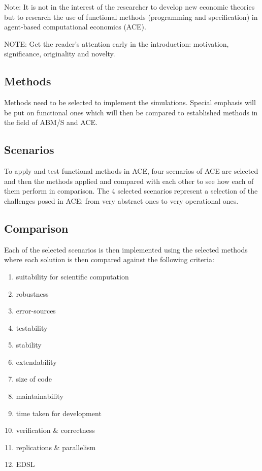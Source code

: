 \documentclass{article}
\begin{document}
Note: It is not in the interest of the researcher to develop new economic theories but to research the use of functional methods (programming and specification) in agent-based computational economics (ACE).

NOTE: Get the reader’s attention early in the introduction: motivation, significance, originality and novelty.

\subsection{Methods}
Methods need to be selected to implement the simulations. Special emphasis will be put on functional ones which will then be compared to established methods in the field of ABM/S and ACE. 

\subsection{Scenarios}
To apply and test functional methods in ACE, four scenarios of ACE are selected and then the methods applied and compared with each other to see how each of them perform in comparison. The 4 selected scenarios represent a selection of the challenges posed in ACE: from very abstract ones to very operational ones.

\subsection{Comparison}
Each of the selected scenarios is then implemented using the selected methods where each solution is then compared against the following criteria: 

\begin{enumerate}
\item suitability for scientific computation
\item robustness
\item error-sources
\item testability
\item stability
\item extendability
\item size of code
\item maintainability
\item time taken for development
\item verification \& correctness
\item replications \& parallelism
\item EDSL
\end{enumerate}
\end{document}
